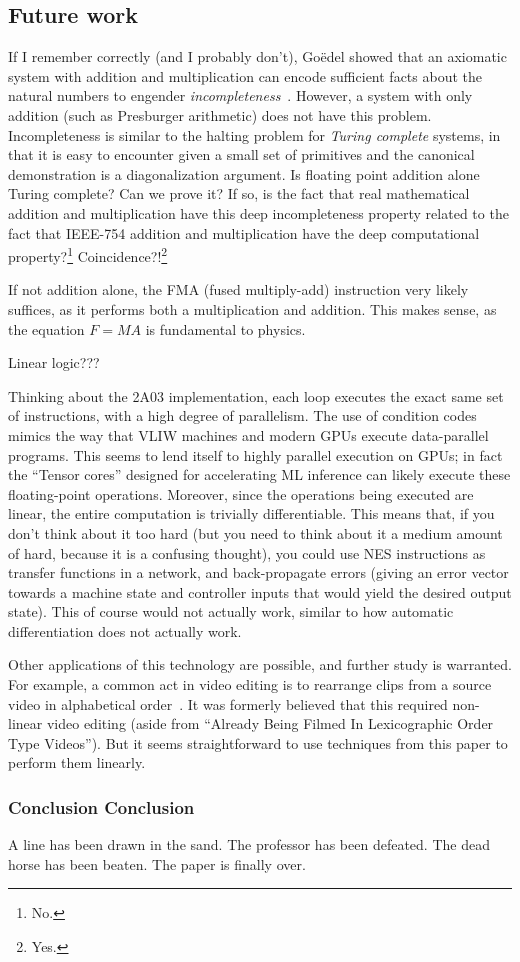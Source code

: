 \documentclass[twocolumn]{article}
\begin{document}
\subsection{Future work}

If I remember correctly (and I probably don't), Go\"edel showed that
an axiomatic system with addition and multiplication can encode
sufficient facts about the natural numbers to engender {\it
  incompleteness}~\cite{goedel1930incompleteness}. However, a system
with only addition (such as Presburger arithmetic) does not have this
problem. Incompleteness is similar to the halting problem for {\it
  Turing complete} systems, in that it is easy to encounter given a
small set of primitives and the canonical demonstration is a
diagonalization argument. Is floating point addition alone Turing
complete? Can we prove it? If so, is the fact that real mathematical
addition and multiplication have this deep incompleteness property
related to the fact that IEEE-754 addition and multiplication have the
deep computational property?\footnote{No.}
Coincidence?!\footnote{Yes.}

If not addition alone, the FMA (fused multiply-add) instruction very
likely suffices, as it performs both a multiplication and addition.
This makes sense, as the equation $F = MA$ is fundamental to physics.

Linear logic???

Thinking about the 2A03 implementation, each loop executes the exact
same set of instructions, with a high degree of parallelism. The use
of condition codes mimics the way that VLIW machines and modern GPUs
execute data-parallel programs. This seems to lend itself to highly
parallel execution on GPUs; in fact the ``Tensor cores'' designed for
accelerating ML inference can likely execute these floating-point
operations. Moreover, since the operations being executed are linear,
the entire computation is trivially differentiable. This means that,
if you don't think about it too hard (but you need to think about it a
medium amount of hard, because it is a confusing thought), you could
use NES instructions as transfer functions in a network, and
back-propagate errors (giving an error vector towards a machine state
and controller inputs that would yield the desired output state). This
of course would not actually work, similar to how automatic
differentiation does not actually work.

Other applications of this technology are possible, and further study
is warranted. For example, a common act in video editing is to
rearrange clips from a source video in alphabetical
order~\cite{murphy2014arst}. It was formerly believed that this
required non-linear video editing (aside from ``Already Being Filmed
In Lexicographic Order Type Videos''). But it seems straightforward to
use techniques from this paper to perform them linearly.

\subsubsection{Conclusion Conclusion}
A line has been drawn in the sand. The professor has been defeated. The dead horse has been beaten.
The paper is finally over.

{}

\end{document}
